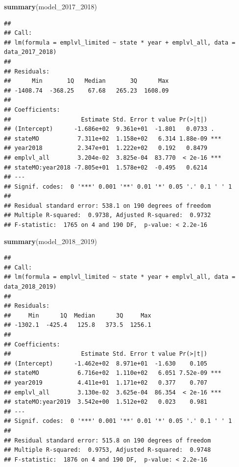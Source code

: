 \documentclass[
]{article}
\newenvironment{Shaded}{\begin{snugshade}}{\end{snugshade}}
\newcommand{\FunctionTok}[1]{\textcolor[rgb]{0.13,0.29,0.53}{\textbf{#1}}}
\newcommand{\NormalTok}[1]{#1}
\begin{document}
\begin{Shaded}
\begin{Highlighting}[]
\FunctionTok{summary}\NormalTok{(model\_2017\_2018)}
\end{Highlighting}
\end{Shaded}

\begin{verbatim}
## 
## Call:
## lm(formula = emplvl_limited ~ state * year + emplvl_all, data = data_2017_2018)
## 
## Residuals:
##      Min       1Q   Median       3Q      Max 
## -1408.74  -368.25    67.68   265.23  1608.09 
## 
## Coefficients:
##                    Estimate Std. Error t value Pr(>|t|)    
## (Intercept)      -1.686e+02  9.361e+01  -1.801   0.0733 .  
## stateMO           7.311e+02  1.158e+02   6.314 1.88e-09 ***
## year2018          2.347e+01  1.222e+02   0.192   0.8479    
## emplvl_all        3.204e-02  3.825e-04  83.770  < 2e-16 ***
## stateMO:year2018 -7.805e+01  1.578e+02  -0.495   0.6214    
## ---
## Signif. codes:  0 '***' 0.001 '**' 0.01 '*' 0.05 '.' 0.1 ' ' 1
## 
## Residual standard error: 538.1 on 190 degrees of freedom
## Multiple R-squared:  0.9738, Adjusted R-squared:  0.9732 
## F-statistic:  1765 on 4 and 190 DF,  p-value: < 2.2e-16
\end{verbatim}

\begin{Shaded}
\begin{Highlighting}[]
\FunctionTok{summary}\NormalTok{(model\_2018\_2019)}
\end{Highlighting}
\end{Shaded}

\begin{verbatim}
## 
## Call:
## lm(formula = emplvl_limited ~ state * year + emplvl_all, data = data_2018_2019)
## 
## Residuals:
##     Min      1Q  Median      3Q     Max 
## -1302.1  -425.4   125.8   373.5  1256.1 
## 
## Coefficients:
##                    Estimate Std. Error t value Pr(>|t|)    
## (Intercept)      -1.462e+02  8.971e+01  -1.630    0.105    
## stateMO           6.716e+02  1.110e+02   6.051 7.52e-09 ***
## year2019          4.411e+01  1.171e+02   0.377    0.707    
## emplvl_all        3.130e-02  3.625e-04  86.354  < 2e-16 ***
## stateMO:year2019  3.542e+00  1.512e+02   0.023    0.981    
## ---
## Signif. codes:  0 '***' 0.001 '**' 0.01 '*' 0.05 '.' 0.1 ' ' 1
## 
## Residual standard error: 515.8 on 190 degrees of freedom
## Multiple R-squared:  0.9753, Adjusted R-squared:  0.9748 
## F-statistic:  1876 on 4 and 190 DF,  p-value: < 2.2e-16
\end{verbatim}
\end{document}
